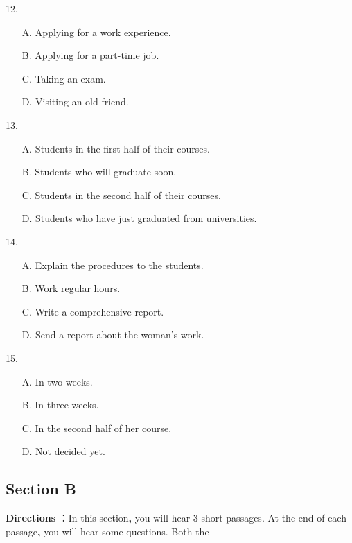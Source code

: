 \documentclass[UTF8,11pt]{ctexart}
\begin{document}
12.


\begin{itemize}[leftmargin=2em,itemsep=.2em,topsep=.4em]\item[A.] Applying for a work experience.
\item[B.] Applying for a part-time job.
\item[C.] Taking an exam.
\item[D.] Visiting an old friend.
\end{itemize}

13.


\begin{itemize}[leftmargin=2em,itemsep=.2em,topsep=.4em]\item[A.] Students in the first half of their courses.
\item[B.] Students who will graduate soon.
\item[C.] Students in the second half of their courses.
\item[D.] Students who have just graduated from universities.
\end{itemize}

14.


\begin{itemize}[leftmargin=2em,itemsep=.2em,topsep=.4em]\item[A.] Explain the procedures to the students.
\item[B.] Work regular hours.
\item[C.] Write a comprehensive report.
\item[D.] Send a report about the woman’s work.
\end{itemize}

15.


\begin{itemize}[leftmargin=2em,itemsep=.2em,topsep=.4em]\item[A.] In two weeks.
\item[B.] In three weeks.
\item[C.] In the second half of her course.
\item[D.] Not decided yet.
\end{itemize}

\subsection*{Section B}


\textbf{Directions} ：In this section\textbf{,} you will hear 3 short passages. At the end of each passage\textbf{,} you will hear some questions. Both the
\end{document}
